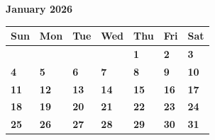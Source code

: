 \documentclass{article}
\newcommand{\dnum}[1]{\textbf{#1}\newline\rule{0pt}{1.9cm}}
\newcommand{\pad}{\mbox{}\newline\rule{0pt}{1.9cm}}
\begin{document}
\begin{center}
  {\fontsize{34}{38}\selectfont\bfseries\color{head} January 2026}
\end{center}
\vspace{6pt}


\begin{tabular}{|C|C|C|C|C|C|C|}
\hline
{}
{\color{white}\textbf{Sun}} & {\color{white}\textbf{Mon}} & {\color{white}\textbf{Tue}} &
{\color{white}\textbf{Wed}} & {\color{white}\textbf{Thu}} & {\color{white}\textbf{Fri}} & {\color{white}\textbf{Sat}} \\
\hline
\pad & \pad & \pad & \pad & \dnum{1} & \dnum{2} & \dnum{3} \\
\hline
\dnum{4} & \dnum{5} & \dnum{6} & \dnum{7} & \dnum{8} & \dnum{9} & \dnum{10} \\
\hline
\dnum{11} & \dnum{12} & \dnum{13} & \dnum{14} & \dnum{15} & \dnum{16} & \dnum{17} \\
\hline
\dnum{18} & \dnum{19} & \dnum{20} & \dnum{21} & \dnum{22} & \dnum{23} & \dnum{24} \\
\hline
\dnum{25} & \dnum{26} & \dnum{27} & \dnum{28} & \dnum{29} & \dnum{30} & \dnum{31} \\
\hline
\end{tabular}
\end{document}
